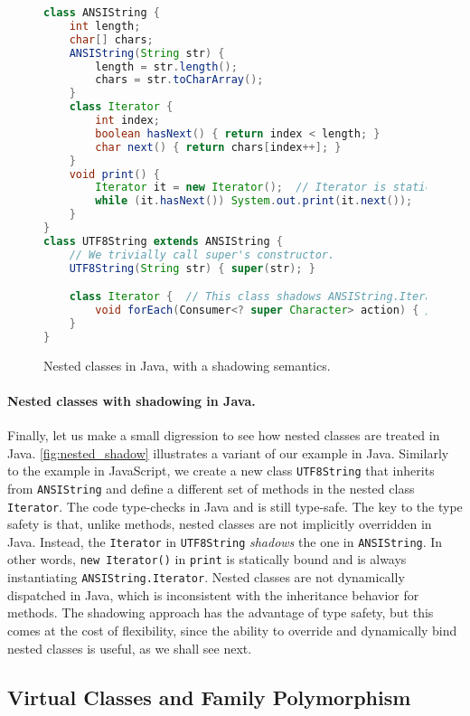 \begin{figure}[b!]
\begin{lstlisting}[language=Java]
class ANSIString {
    int length;
    char[] chars;
    ANSIString(String str) {
        length = str.length();
        chars = str.toCharArray();
    }
    class Iterator {
        int index;
        boolean hasNext() { return index < length; }
        char next() { return chars[index++]; }
    }
    void print() {
        Iterator it = new Iterator();  // Iterator is statically bound.
        while (it.hasNext()) System.out.print(it.next());
    }
}
class UTF8String extends ANSIString {
    // We trivially call super's constructor.
    UTF8String(String str) { super(str); }

    class Iterator {  // This class shadows ANSIString.Iterator.
        void forEach(Consumer<? super Character> action) { /* ... */ }
    }
}
\end{lstlisting}
\caption{Nested classes in Java, with a shadowing semantics.}
\label{fig:nested_shadow}
\end{figure}

\paragraph{Nested classes with shadowing in Java.}
Finally, let us make a small digression to see how nested classes are treated in
Java. \autoref{fig:nested_shadow} illustrates a variant of our example in Java.
Similarly to the example in JavaScript, we create a new class
\lstinline{UTF8String} that inherits from \lstinline{ANSIString} and define a
different set of methods in the nested class \lstinline{Iterator}. The code
type-checks in Java and is still type-safe. The key to the type safety is that,
unlike methods, nested classes are not implicitly overridden in Java. Instead,
the \lstinline{Iterator} in \lstinline{UTF8String} \emph{shadows} the one in
\lstinline{ANSIString}. In other words, \lstinline{new Iterator()} in
\lstinline{print} is statically bound and is always instantiating
\lstinline{ANSIString.Iterator}. Nested classes are not dynamically dispatched
in Java, which is inconsistent with the inheritance behavior for methods. The
shadowing approach has the advantage of type safety, but this comes at the cost
of flexibility, since the ability to override and dynamically bind nested
classes is useful, as we shall see next.

\subsection{Virtual Classes and Family Polymorphism} \label{sec:family}

